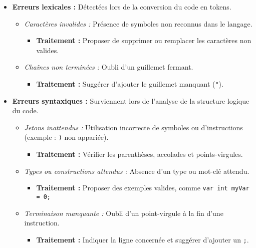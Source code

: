 \documentclass[12pt,a4paper]{report}
\begin{document}
\begin{itemize}
    \item \textbf{Erreurs lexicales :} Détectées lors de la conversion du code en tokens.
    \begin{itemize}
        \item \textit{Caractères invalides :} Présence de symboles non reconnus dans le langage.
        \begin{itemize}
            \item \textbf{Traitement :} Proposer de supprimer ou remplacer les caractères non valides.
        \end{itemize}
        \item \textit{Chaînes non terminées :} Oubli d'un guillemet fermant.
        \begin{itemize}
            \item \textbf{Traitement :} Suggérer d'ajouter le guillemet manquant (\texttt{"}).\\
        \end{itemize}
    \end{itemize}

    \item \textbf{Erreurs syntaxiques :} Surviennent lors de l'analyse de la structure logique du code.
    \begin{itemize}
        \item \textit{Jetons inattendus :} Utilisation incorrecte de symboles ou d'instructions (exemple : \texttt{)} non appariée).
        \begin{itemize}
            \item \textbf{Traitement :} Vérifier les parenthèses, accolades et points-virgules.
        \end{itemize}
        \item \textit{Types ou constructions attendus :} Absence d'un type ou mot-clé attendu.
        \begin{itemize}
            \item \textbf{Traitement :} Proposer des exemples valides, comme \texttt{var int myVar = 0;}
        \end{itemize}
        \item \textit{Terminaison manquante :} Oubli d'un point-virgule à la fin d'une instruction.
        \begin{itemize}
            \item \textbf{Traitement :} Indiquer la ligne concernée et suggérer d'ajouter un \texttt{;}.\\
        \end{itemize}
    \end{itemize}


\end{itemize}
\end{document}
